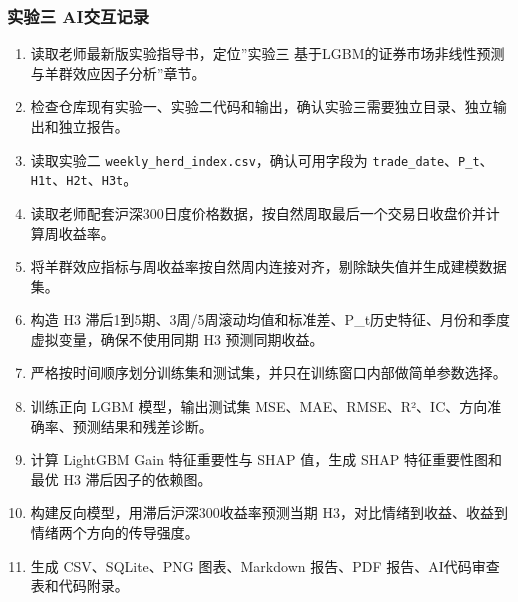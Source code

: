 \subsubsection{实验三 AI交互记录}\label{ux5b9eux9a8cux4e09-aiux4ea4ux4e92ux8bb0ux5f55}

\begin{enumerate}
\def\labelenumi{\arabic{enumi}.}
\tightlist
\item
  读取老师最新版实验指导书，定位''实验三 基于LGBM的证券市场非线性预测与羊群效应因子分析''章节。
\item
  检查仓库现有实验一、实验二代码和输出，确认实验三需要独立目录、独立输出和独立报告。
\item
  读取实验二 \texttt{weekly\_herd\_index.csv}，确认可用字段为 \texttt{trade\_date}、\texttt{P\_t}、\texttt{H1t}、\texttt{H2t}、\texttt{H3t}。
\item
  读取老师配套沪深300日度价格数据，按自然周取最后一个交易日收盘价并计算周收益率。
\item
  将羊群效应指标与周收益率按自然周内连接对齐，剔除缺失值并生成建模数据集。
\item
  构造 H3 滞后1到5期、3周/5周滚动均值和标准差、P\_t历史特征、月份和季度虚拟变量，确保不使用同期 H3 预测同期收益。
\item
  严格按时间顺序划分训练集和测试集，并只在训练窗口内部做简单参数选择。
\item
  训练正向 LGBM 模型，输出测试集 MSE、MAE、RMSE、R²、IC、方向准确率、预测结果和残差诊断。
\item
  计算 LightGBM Gain 特征重要性与 SHAP 值，生成 SHAP 特征重要性图和最优 H3 滞后因子的依赖图。
\item
  构建反向模型，用滞后沪深300收益率预测当期 H3，对比情绪到收益、收益到情绪两个方向的传导强度。
\item
  生成 CSV、SQLite、PNG 图表、Markdown 报告、PDF 报告、AI代码审查表和代码附录。
\end{enumerate}
